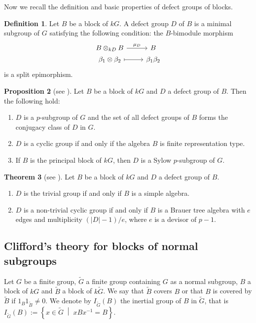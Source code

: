 \documentclass[pdftex,a4paper]{article}
\numberwithin{equation}{subsection}
\theoremstyle{definition}
\newtheorem{theorem}{Theorem}[section]
\newtheorem{proposition}[theorem]{Proposition}
\newtheorem{definition}[theorem]{Definition}
\newcommand{\setmid}{\; \middle|\;}
\newcommand{\inertiagp}{I}
\begin{document}
Now we recall the definition and basic properties of defect groups of blocks.
\begin{definition}
	Let \(B\) be a block of \(kG\).
	A defect group \(D\) of \(B\) is a minimal subgroup of \(G\) satisfying the following condition:
	the \(B\)-bimodule morphism
	\begin{equation}
		\begin{tikzcd}[row sep=1pt]
			B\otimes_{kD}B \ar[r,"\mu_D"]& B\\
			\beta _1\otimes \beta _2 \ar[r,mapsto]&  \beta _1 \beta _2
		\end{tikzcd}
	\end{equation}
	is a split epimorphism.
\end{definition}

\begin{proposition}[{see \cite[Chapter 4, 5]{MR860771}}]
	Let \(B\) be a block of \(kG\) and \(D\) a defect group of \(B\). Then the following hold:
	\begin{enumerate}
		\item \(D\) is a \(p\)-subgroup of \(G\) and the set of all defect groups of \(B\) forms the conjugacy class of \(D\) in \(G\).
		\item \(D\) is a cyclic group if and only if the algebra \(B\) is finite representation type.
		\item If \(B\) is the principal block of \(kG\), then \(D\) is a Sylow \(p\)-subgroup of \(G\).
	\end{enumerate}
\end{proposition}

\begin{theorem}[{see \cite[Corollary 14.6, Theorem 17.1 and proof of Lemma 19.3]{MR860771}}]\label{Theorem:Dade Brauer Tree}
	Let \(B\) be a block of \(kG\) and \(D\) a defect group of \(B\).
	\begin{enumerate}
		\item \(D\) is the trivial group if and only if \(B\) is a simple algebra.
		\item \(D\) is a non-trivial cyclic group if and only if \(B\) is a Brauer tree algebra with \(e\) edges and  multiplicity \((|D|-1)/e\), where \(e\) is a devisor of \(p-1\).\label{2021-12-06 18:37:08}
	\end{enumerate}
\end{theorem}
\subsection{Clifford's theory for blocks of normal subgroups}
Let \(G\) be a  finite group, \(\tilde{G}\) a finite group containing \(G\) as a normal subgroup, \(B\) a block of \(kG\) and \(\tilde{B}\) a block of \(k\tilde{G}\).
We say that \(\tilde{B}\) covers \(B\) or that \(B\) is covered by \(\tilde{B}\) if \(1_B 1_{\tilde{B}}\neq 0\). We denote by \(\inertiagp_{\tilde{G}}(B)\) the  inertial group of \(B\) in \(\tilde{G}\), that is \(\inertiagp_{\tilde{G}}(B):=\left\{ x \in \tilde{G} \setmid xBx^{-1} = B \right\}\).
\end{document}

